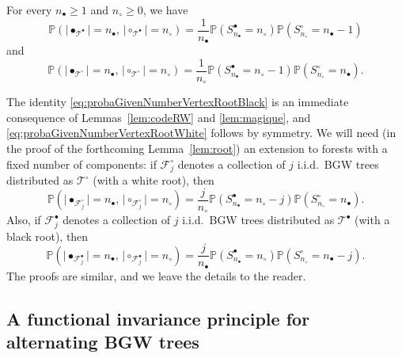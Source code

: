 \documentclass[10pt]{amsart}
\theoremstyle{definition}\newtheorem{defi}[theo]{Definition}\newtheorem{rema}[theo]{Remark}\newtheorem{exam}[theo]{Example}\newtheorem{exem}[theo]{Example}\newtheorem{nota}[theo]{Notation}
\providecommand{\abs}[1]{\lvert#1\rvert}
\def\nc{n_{\circ}}
\def\nb{n_{\bullet}}
\def \Tsb{\Ts^{\bullet}}
\def \Tsc{\Ts^{\circ}}
\def\Ts{\mathscr{T}}
\renewcommand\Pr[1]{\mathbb{P}\left(#1\right)}
\begin{document}
\begin{corollary}
  \label{cor:probaGivenNumber}
For every $\nb \geq 1$ and $\nc \geq 0$, we have
\begin{equation}
\Pr{
\abs{\bullet_{\Tsb}}=n_\bullet,\, \abs{\circ_{\Tsb}}=n_\circ } = \frac{1}{n_\bullet} \Pr{S^{\bullet}_{n_\bullet}=n_\circ} \Pr{S^{\circ}_{n_\circ}=n_\bullet-1}
\label{eq:probaGivenNumberVertexRootBlack}
\end{equation}
and
\begin{equation}
\Pr{
\abs{\bullet_{\Tsc}}=n_\bullet,\, \abs{\circ_{\Tsc}}=n_\circ } =
\frac{1}{n_\circ} \Pr{S^{\bullet}_{n_\bullet}=n_\circ-1} \Pr{S^{\circ}_{n_\circ}=n_\bullet}.
\label{eq:probaGivenNumberVertexRootWhite}
\end{equation}
\end{corollary}

The identity \eqref{eq:probaGivenNumberVertexRootBlack} is an immediate consequence of  Lemmas~\ref{lem:codeRW} and \ref{lem:magique},  and \eqref{eq:probaGivenNumberVertexRootWhite}  follows by symmetry. We will need (in the proof of the forthcoming Lemma~\ref{lem:root}) an extension to forests with a fixed number of components: if $ \mathscr{F}^{\circ}_{j}$ denotes a collection of $j$ i.i.d.\ BGW trees distributed as  $ \Tsc$ (with a white root), then
\begin{equation}
\label{eq:forestc}
\Pr{\abs{\bullet_{\mathscr{F}^{\circ}_{j}}}=n_\bullet,\, \abs{\circ_{\mathscr{F}^{\circ}_{j}}}=n_\circ } =
\frac{j}{n_\circ} \Pr{S^{\bullet}_{n_\bullet}=n_\circ-j} \Pr{S^{\circ}_{n_\circ}=n_\bullet}.
\end{equation}
Also,  if $ \mathscr{F}^{\bullet}_{j}$ denotes a collection of $j$ i.i.d.\ BGW trees distributed as  $ \Tsb$ (with a black root), then
\begin{equation}
\label{eq:forestb}
\Pr{\abs{\bullet_{\mathscr{F}^{\bullet}_{j}}}=n_\bullet,\, \abs{\circ_{\mathscr{F}^{\bullet}_{j}}}=n_\circ } =
\frac{j}{n_\bullet} \Pr{S^{\bullet}_{n_\bullet}=n_\circ} \Pr{S^{\circ}_{n_\circ}=n_\bullet-j}.
\end{equation}
The proofs are similar, and we leave the details to the reader.

\subsection{A functional invariance principle for alternating BGW trees}
\label{ss:inv}
\end{document}

